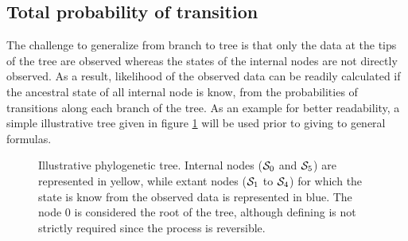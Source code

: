 \subsection{Total probability of transition}
The challenge to generalize from branch to tree is that only the data at the tips of the tree are observed whereas the states of the internal nodes are not directly observed.
As a result, \gls{likelihood} of the observed data can be readily calculated if the ancestral state of all internal node is know, from the probabilities of {transitions} along each branch of the tree.
As an example for better readability, a simple illustrative tree given in figure \ref{fig:tree} will be used \gls{prior} to giving to general formulas.
\begin{figure}[H]
    \centering
    \caption[Illustrative phylogenetic tree]{
    Illustrative phylogenetic tree. Internal nodes ($\mathcal{S}_0$ and $\mathcal{S}_5$) are represented in yellow, while extant nodes ($\mathcal{S}_1$ to $\mathcal{S}_4$) for which the state is know from the observed data is represented in blue. The node $0$ is considered the root of the tree, although defining is not strictly required since the process is reversible.}
    \label{fig:tree}%
\end{figure}

